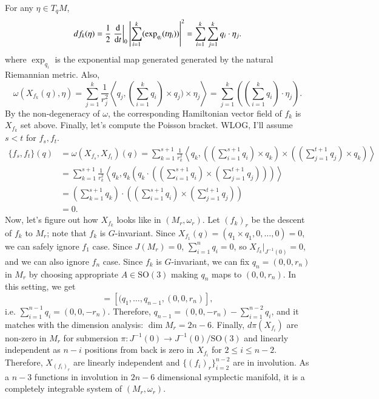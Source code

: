 \documentclass[a4paper, 12pt]{article}
\theoremstyle{Mydefinition}
\theoremstyle{Mytheorem}
\begin{document}
\begin{enumerate}
    For any $\eta\in T_qM$,
    \begin{equation*}
        df_k(\eta) = \frac{1}{2}\left.\dv{t}\right|_{0}\abs{\sum_{i=1}^{k}(\exp_{q_i}(t\eta_i))}^2 = \sum_{i=1}^{k}\sum_{j=1}^{k}q_i\cdot \eta_j.
    \end{equation*}
    where $\exp_{q_i}$ is the exponential map generated generated by the natural Riemannian metric. Also,
    \begin{equation*}
        \omega\left(X_{f_k}(q),\eta\right) = \sum_{j=1}^{k}\frac{1}{r_j^2}\left\langle q_j, \left(\sum_{i=1}^{k}q_i\right)\times q_j)\times \eta_j\right\rangle = \sum_{j=1}^{k}\left(\left(\sum_{i=1}^{k} q_i\right)\cdot \eta_j\right).
    \end{equation*}
    By the non-degeneracy of $\omega$, the corresponding Hamiltonian vector field of $f_k$ is $X_{f_k}$ set above.
    Finally, let's compute the Poisson bracket. WLOG, I'll assume $s<t$ for $f_s,f_t$.
    \begin{equation*}
    \begin{split}
        \{f_s, f_t\}(q) &= \omega(X_{f_s}, X_{f_t})(q) = \sum_{k=1}^{s+1}\frac{1}{r_k^2}\left\langle q_k, \left(\left(\sum_{i=1}^{s+1}q_i\right)\times q_k\right)\times \left(\left(\sum_{j=1}^{t+1}q_j\right)\times q_k\right)\right\rangle\\
        &=\sum_{k=1}^{s+1}\frac{1}{r_k^2}\left\langle q_k, q_k\left(q_k\cdot\left(\left(\sum_{i=1}^{s+1}q_i\right)\times \left(\sum_{j=1}^{t+1}q_j\right)\right)\right)\right\rangle\\
        &=\left(\sum_{k=1}^{s+1}q_k\right)\cdot\left(\left(\sum_{i=1}^{s+1}q_i\right)\times \left(\sum_{j=1}^{t+1}q_j\right)\right)\\
        &=0.
    \end{split}
    \end{equation*}
    Now, let's figure out how $X_{f_k}$ looks like in $(M_r, \omega_r)$. Let $(f_k)_{r}$ be the descent of $f_k$ to $M_r$; note that $f_k$ is $G$-invariant. Since $X_{f_1}(q) = (q_1\times q_1, 0,\ldots, 0)=0$, we can safely ignore $f_1$ case. Since $J(M_r) = 0$, $\sum_{i=1}^n q_i = 0$, so $X_{f_k}|_{J^{-1}(0)} = 0$, and we can also ignore $f_n$ case. Since $f_k$ is $G$-invariant, we can fix $q_n = (0,0,r_n)$ in  $M_r$ by choosing appropriate $A\in \mathrm{SO}(3)$ making $q_n$ maps to $(0,0,r_n)$. In this setting, we get
    \begin{equation}
        [q] = [(q_1, \ldots, q_{n-1}, (0,0,r_n)],
    \end{equation}
    i.e. $\sum_{i=1}^{n-1}q_{i} = (0,0,-r_n)$. Therefore, $q_{n-1} = (0,0,-r_n) - \sum_{i=1}^{n-2}q_{i}$, and it matches with the dimension analysis: $\dim M_r = 2n-6$. Finally, $d\pi(X_{f_i})$ are non-zero in $M_r$ for submersion $\pi:J^{-1}(0)\rightarrow J^{-1}(0)/\mathrm{SO}(3)$ and linearly independent as $n-i$ positions from back is zero in $X_{f_i}$ for $2\leq i\leq n-2$. Therefore, $X_{(f_i)_r}$ are linearly independent and $\{(f_{i})_r\}_{i=2}^{n-2}$ are in involution. As a $n-3$ functions in involution in $2n-6$ dimensional symplectic manifold, it is a completely integrable system of $(M_r, \omega_r)$.
\end{enumerate}
\end{document}
